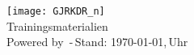 	\begin{center}
		\texttt{[image: GJRKDR\_n]}\\
		Trainingsmaterialien\\{\scriptsize \textsf{Powered by} \LaTeXe \textsf{\,-\,Stand: \today,\,\currenttime Uhr}} 
	\end{center}
